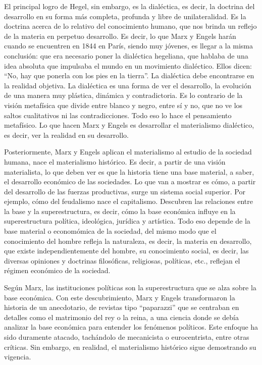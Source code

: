 \documentclass[
  a4paper,
]{article}
\begin{document}
El principal logro de Hegel, sin embargo, es la dialéctica, es decir, la
doctrina del desarrollo en su forma más completa, profunda y libre de
unilateralidad. Es la doctrina acerca de lo relativo del conocimiento
humano, que nos brinda un reflejo de la materia en perpetuo desarrollo.
Es decir, lo que Marx y Engels harán cuando se encuentren en 1844 en
París, siendo muy jóvenes, es llegar a la misma conclusión: que era
necesario poner la dialéctica hegeliana, que hablaba de una idea
absoluta que impulsaba el mundo en un movimiento dialéctico. Ellos
dicen: ``No, hay que ponerla con los pies en la tierra''. La dialéctica
debe encontrarse en la realidad objetiva. La dialéctica es una forma de
ver el desarrollo, la evolución de una manera muy plástica, dinámica y
contradictoria. Es lo contrario de la visión metafísica que divide entre
blanco y negro, entre sí y no, que no ve los saltos cualitativos ni las
contradicciones. Todo eso lo hace el pensamiento metafísico. Lo que
hacen Marx y Engels es desarrollar el materialismo dialéctico, es decir,
ver la realidad en su desarrollo.

Posteriormente, Marx y Engels aplican el materialismo al estudio de la
sociedad humana, nace el materialismo histórico. Es decir, a partir de
una visión materialista, lo que deben ver es que la historia tiene una
base material, a saber, el desarrollo económico de las sociedades. Lo
que van a mostrar es cómo, a partir del desarrollo de las fuerzas
productivas, surge un sistema social superior. Por ejemplo, cómo del
feudalismo nace el capitalismo. Descubren las relaciones entre la base y
la superestructura, es decir, cómo la base económica influye en la
superestructura política, ideológica, jurídica y artística. Todo eso
depende de la base material o economómica de la sociedad, del mismo modo
que el conocimiento del hombre refleja la naturaleza, es decir, la
materia en desarrollo, que existe independientemente del hombre, su
conocimiento social, es decir, las diversas opiniones y doctrinas
filosóficas, religiosas, políticas, etc., reflejan el régimen económico
de la sociedad.

Según Marx, las instituciones políticas son la superestructura que se
alza sobre la base económica. Con este descubrimiento, Marx y Engels
transformaron la historia de un anecdotario, de revistas tipo
``paparazzi'' que se centraban en detalles como el matrimonio del rey o
la reina, a una ciencia donde se debía analizar la base económica para
entender los fenómenos políticos. Este enfoque ha sido duramente
atacado, tachándolo de mecanicista o eurocentrista, entre otras
críticas. Sin embargo, en realidad, el materialismo histórico sigue
demostrando su vigencia.
\end{document}
